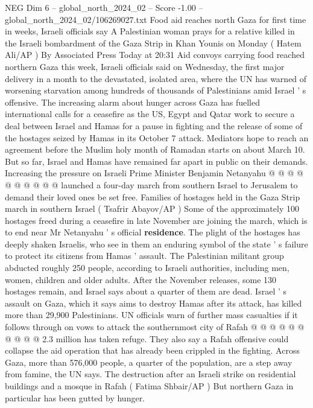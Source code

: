 \begin{textsample}{NEG Dim 6 – global\_north\_2024\_02 – Score -1.00 – global\_north\_2024\_02/106269027.txt}  \label{ex:f6_neg_278}
Food aid reaches north Gaza for first time in weeks, Israeli officials say A Palestinian woman prays for a relative killed in the Israeli bombardment of the Gaza Strip in Khan Younis on Monday ( Hatem Ali/AP ) By Associated Press Today at 20:31 Aid convoys carrying food reached northern Gaza this week, Israeli officials said on Wednesday, the first major delivery in a month to the devastated, isolated area, where the UN has warned of worsening starvation among hundreds of thousands of Palestinians amid Israel ' s offensive.
The increasing alarm about hunger across Gaza has fuelled international calls for a ceasefire as the US, Egypt and Qatar work to secure a deal between Israel and Hamas for a pause in fighting and the release of some of the hostages seized by Hamas in its October 7 attack.
Mediators hope to reach an agreement before the Muslim holy month of Ramadan starts on about March 10.
But so far, Israel and Hamas have remained far apart in public on their demands.
Increasing the pressure on Israeli Prime Minister Benjamin Netanyahu @ @ @ @ @ @ @ @ @ @ launched a four-day march from southern Israel to Jerusalem to demand their loved ones be set free.
Families of hostages held in the Gaza Strip march in southern Israel ( Tsafrir Abayov/AP ) Some of the approximately 100 hostages freed during a ceasefire in late November are joining the march, which is to end near Mr Netanyahu ' s official \textbf{residence}.
The plight of the hostages has deeply shaken Israelis, who see in them an enduring symbol of the state ' s failure to protect its citizens from Hamas ' assault.
The Palestinian militant group abducted roughly 250 people, according to Israeli authorities, including men, women, children and older adults.
After the November releases, some 130 hostages remain, and Israel says about a quarter of them are dead.
Israel ' s assault on Gaza, which it says aims to destroy Hamas after its attack, has killed more than 29,900 Palestinians.
UN officials warn of further mass casualties if it follows through on vows to attack the southernmost city of Rafah @ @ @ @ @ @ @ @ @ @ 2.3 million has taken refuge.
They also say a Rafah offensive could collapse the aid operation that has already been crippled in the fighting.
Across Gaza, more than 576,000 people, a quarter of the population, are a step away from famine, the UN says.
The destruction after an Israeli strike on residential buildings and a mosque in Rafah ( Fatima Shbair/AP ) But northern Gaza in particular has been gutted by hunger.

\end{textsample}
